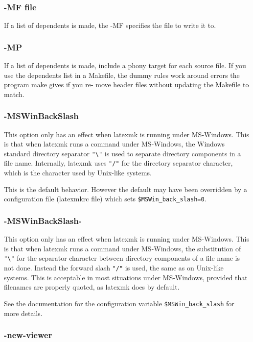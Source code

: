 \subsubsection{-MF file}

If a list of dependents is made, the -MF specifies the  file  to
write it to.


\subsubsection{-MP}

If a list of dependents is made, include a phony target for each
source file.  If you use the dependents list in a Makefile,  the
dummy rules work around errors the program make gives if you re-
move header files without updating the Makefile to match.

\subsubsection{-MSWinBackSlash}

This option only has an effect when latexmk is running under MS-Windows.  This
is that when latexmk runs a command under MS-Windows, the Windows standard
directory separator \verb|"\"|  is  used  to separate  directory  components in a file
name.  Internally, latexmk uses \verb|"/"| for the directory separator character,
which  is the character used by Unix-like systems.

This is the default behavior.  However the default may have been overridden by
a configuration file (latexmkrc file)  which  sets \verb|$MSWin_back_slash=0|.


\subsubsection{-MSWinBackSlash-}

This option only has an effect when latexmk is running under MS-Windows.  This
is that when latexmk runs a command under MS-Windows,  the  substitution  of
\verb|"\"| for the separator character between directory components of a file
name is not  done. Instead the forward slash \verb|"/"| is used, the same as
on Unix-like systems.  This is acceptable in most situations under MS-Windows,
provided that filenames are properly quoted, as latexmk does by default.

See   the   documentation   for   the   configuration   variable
\verb|$MSWin_back_slash| for more details.


\subsubsection{-new-viewer}

